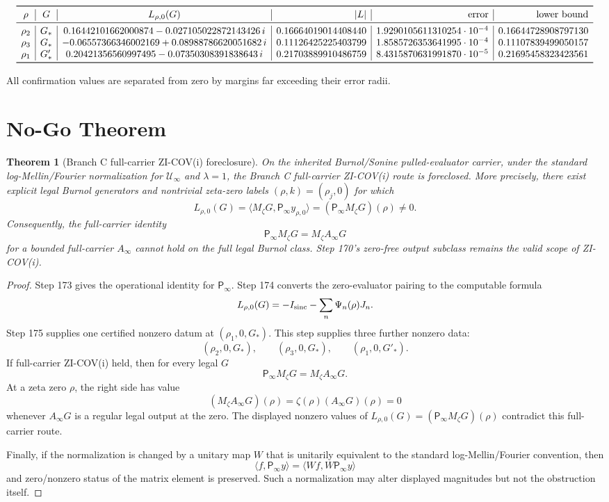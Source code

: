 \documentclass[11pt]{article}
\newtheorem{theorem}{Theorem}
\newcommand{\Psym}{\mathsf P_\infty}
\newcommand{\Mz}{M_\zeta}
\newcommand{\Uinf}{\mathcal U_\infty}
\begin{document}
\[
\begin{array}{c|c|c|r|r|r}
\toprule
\rho & G & L_{\rho,0}(G) & |L| & \text{error} & \text{lower bound}\\
\midrule
\rho_2 & G_* &
0.16442101662000874-0.027105022872143426\,i &
0.16664019014408440 &
1.9290105611310254\cdot10^{-4} &
0.16644728908797130\\
\rho_3 & G_* &
-0.06557366346002169+0.08988786620051682\,i &
0.11126425225403799 &
1.8585726353641995\cdot10^{-4} &
0.11107839499050157\\
\rho_1 & G'_* &
0.20421356560997495-0.07350308391838643\,i &
0.21703889910486759 &
8.4315870631991870\cdot10^{-5} &
0.21695458323423561\\
\bottomrule
\end{array}
\]

All confirmation values are separated from zero by margins far exceeding their
error radii.

\section{No-Go Theorem}

\begin{theorem}[Branch C full-carrier ZI-COV(i) foreclosure]
On the inherited Burnol/Sonine pulled-evaluator carrier, under the standard
log-Mellin/Fourier normalization for \(\Uinf\) and \(\lambda=1\), the Branch C
full-carrier ZI-COV(i) route is foreclosed.  More precisely, there exist
explicit legal Burnol generators and nontrivial zeta-zero labels
\((\rho,k)=(\rho_j,0)\) for which
\[
L_{\rho,0}(G)
=\langle \Mz G,\Psym y_{\rho,0}\rangle
= (\Psym\Mz G)(\rho)
\ne0.
\]
Consequently, the full-carrier identity
\[
\Psym\Mz G=\Mz A_\infty G
\]
for a bounded full-carrier \(A_\infty\) cannot hold on the full legal Burnol
class.  Step 170's zero-free output subclass remains the valid scope of
ZI-COV(i).
\end{theorem}

\begin{proof}
Step 173 gives the operational identity for \(\Psym\).  Step 174 converts the
zero-evaluator pairing to the computable formula
\[
L_{\rho,0}(G)=-I_{\rm sinc}-\sum_n\Psi_n(\rho)J_n.
\]
Step 175 supplies one certified nonzero datum at \((\rho_1,0,G_*)\).  This
step supplies three further nonzero data:
\[
(\rho_2,0,G_*),\qquad
(\rho_3,0,G_*),\qquad
(\rho_1,0,G'_*).
\]
If full-carrier ZI-COV(i) held, then for every legal \(G\)
\[
\Psym\Mz G=\Mz A_\infty G.
\]
At a zeta zero \(\rho\), the right side has value
\[
(\Mz A_\infty G)(\rho)=\zeta(\rho)(A_\infty G)(\rho)=0
\]
whenever \(A_\infty G\) is a regular legal output at the zero.  The displayed
nonzero values of \(L_{\rho,0}(G)=(\Psym\Mz G)(\rho)\) contradict this
full-carrier route.

Finally, if the normalization is changed by a unitary map \(W\) that is
unitarily equivalent to the standard log-Mellin/Fourier convention, then
\[
\langle f,\Psym y\rangle
=\langle Wf,W\Psym y\rangle
\]
and zero/nonzero status of the matrix element is preserved.  Such a
normalization may alter displayed magnitudes but not the obstruction itself.
\end{proof}
\end{document}
